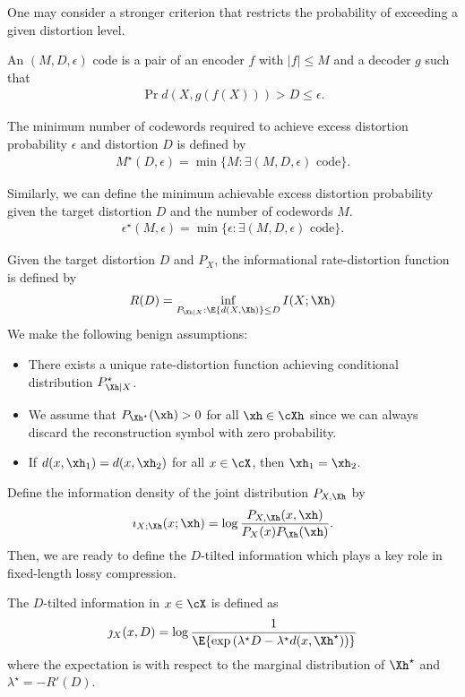 \documentclass[draftclsnofoot, onecolumn, letterpaper, romanappendices]{IEEEtran}
\begin{document}
One may consider a stronger criterion that restricts the probability of exceeding a given distortion level.
\begin{definition}
    An $(M,D,\epsilon)$ code is a pair of an encoder $f$ with $|f|\leq M$ and a decoder $g$ such that
    \begin{align*}
        \Pr{d(X,g(f(X)))>D}\leq \epsilon.
    \end{align*}
    
    The minimum number of codewords required to achieve excess distortion probability $\epsilon$
    and distortion $D$ is defined by
    \begin{align*}
        M^\star(D,\epsilon) = \min\{M: \exists (M,D,\epsilon)\mbox{ code}\}.
    \end{align*}
    
    Similarly, we can define the minimum achievable excess distortion probability
    given the target distortion $D$ and the number of codewords $M$.
    \begin{align*}
        \epsilon^\star(M,\epsilon) = \min\{\epsilon: \exists (M,D,\epsilon)\mbox{ code}\}.
    \end{align*}
\end{definition}

Given the target distortion $D$ and $P_X$, the informational rate-distortion function is defined by
\begin{align*}
    R(D) = \inf_{P_{\Xh|X}: \E{d(X,\Xh)}\leq D} I(X;\Xh)
\end{align*}
We make the following benign assumptions:
\begin{itemize}
    \item There exists a unique rate-distortion function achieving
        conditional distribution $P_{\Xh|X}^\star$.
    \item We assume that $P_{\Xh^\star}(\xh)>0$ for all $\xh\in\cXh$
        since we can always discard the reconstruction symbol with zero probability.
    \item If $d(x,\xh_1) = d(x,\xh_2)$ for all $x\in\cX$, then $\xh_1 = \xh_2$.
\end{itemize}

Define the information density of the joint distribution $P_{X,\Xh}$ by
\begin{align*}
    \imath_{X;\Xh}(x;\xh)  = \log \frac {P_{X,\Xh}(x,\xh)}{P_X(x) P_{\Xh}(\xh)}.
\end{align*}
Then, we are ready to define the $D$-tilted information which plays a key role
in fixed-length lossy compression.
\begin{definition}\cite[Definition 6]{kostina2012fixed}
    The $D$-tilted information in $x\in\cX$ is defined as
    \begin{align*}
        \jmath_X(x,D) = \log\frac{1}{\E{\exp\left(\lambda^{\star} D
            - \lambda^{\star} d(x,\Xh^{\star})\right)}}
    \end{align*}
    where the expectation is with respect to the marginal distribution of $\Xh^{\star}$
    and $\lambda^{\star} = -R'(D)$.
\end{definition}
\end{document}
